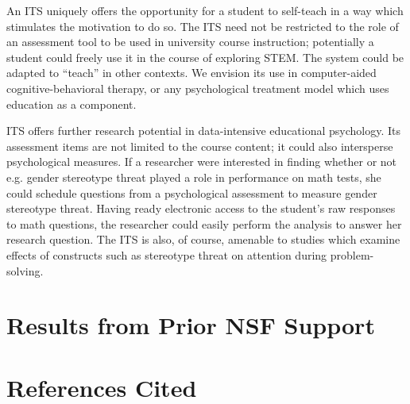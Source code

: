 \documentclass[hidelinks,11pt]{article}
\begin{document}
An ITS uniquely offers the opportunity for a student to self-teach in a way
which stimulates the motivation to do so. The ITS need not be restricted to the
role of an assessment tool to be used in university course instruction;
potentially a student could freely use it in the course of exploring STEM.  The
system could be adapted to ``teach'' in other contexts.  We envision its use in
computer-aided cognitive-behavioral therapy, or any psychological treatment
model which uses education as a component. 

ITS offers further research potential in data-intensive educational psychology.
Its assessment items are not limited to the course content; it could also
intersperse psychological measures.  If a researcher were interested in finding
whether or not e.g. gender stereotype threat played a role in performance on
math tests, she could schedule questions from a psychological assessment to
measure gender stereotype threat.  Having ready electronic access to the
student’s raw responses to math questions, the researcher could easily perform
the analysis to answer her research question. The ITS is also, of course,
amenable to studies which examine effects of constructs such as stereotype
threat on attention during problem-solving.

\pagebreak
\section{ Results from Prior NSF Support }

\pagebreak
\section{ References Cited }



\end{document}
